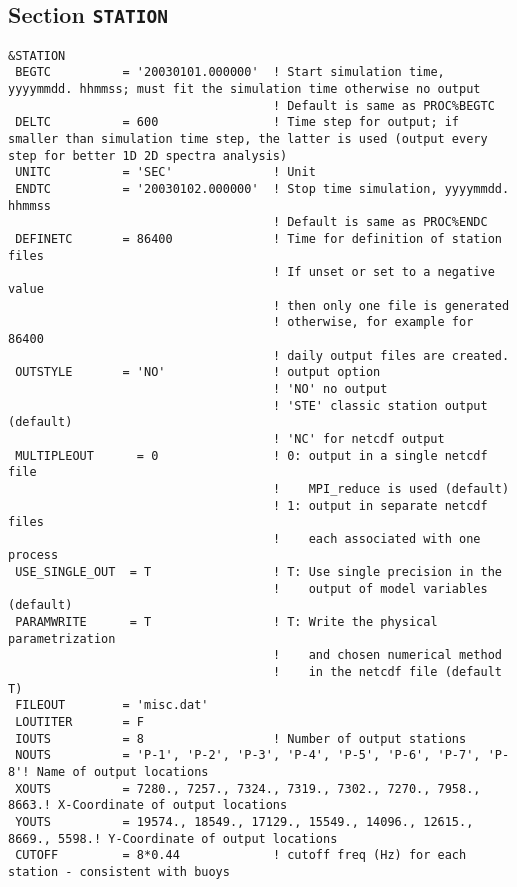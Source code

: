 \documentclass[12pt]{amsart}
\begin{document}
\subsection{Section {\tt STATION}}
\begin{verbatim}
&STATION
 BEGTC          = '20030101.000000'  ! Start simulation time, yyyymmdd. hhmmss; must fit the simulation time otherwise no output
                                     ! Default is same as PROC%BEGTC
 DELTC          = 600                ! Time step for output; if smaller than simulation time step, the latter is used (output every step for better 1D 2D spectra analysis)
 UNITC          = 'SEC'              ! Unit
 ENDTC          = '20030102.000000'  ! Stop time simulation, yyyymmdd. hhmmss
                                     ! Default is same as PROC%ENDC
 DEFINETC       = 86400              ! Time for definition of station files
                                     ! If unset or set to a negative value
                                     ! then only one file is generated
                                     ! otherwise, for example for 86400
                                     ! daily output files are created.
 OUTSTYLE       = 'NO'               ! output option
                                     ! 'NO' no output
                                     ! 'STE' classic station output (default)
                                     ! 'NC' for netcdf output
 MULTIPLEOUT      = 0                ! 0: output in a single netcdf file
                                     !    MPI_reduce is used (default)
                                     ! 1: output in separate netcdf files
                                     !    each associated with one process
 USE_SINGLE_OUT  = T                 ! T: Use single precision in the
                                     !    output of model variables (default)
 PARAMWRITE      = T                 ! T: Write the physical parametrization
                                     !    and chosen numerical method
                                     !    in the netcdf file (default T)
 FILEOUT        = 'misc.dat'
 LOUTITER       = F
 IOUTS          = 8                  ! Number of output stations
 NOUTS          = 'P-1', 'P-2', 'P-3', 'P-4', 'P-5', 'P-6', 'P-7', 'P-8'! Name of output locations
 XOUTS          = 7280., 7257., 7324., 7319., 7302., 7270., 7958., 8663.! X-Coordinate of output locations
 YOUTS          = 19574., 18549., 17129., 15549., 14096., 12615., 8669., 5598.! Y-Coordinate of output locations
 CUTOFF         = 8*0.44             ! cutoff freq (Hz) for each station - consistent with buoys

\end{verbatim}
\end{document}
